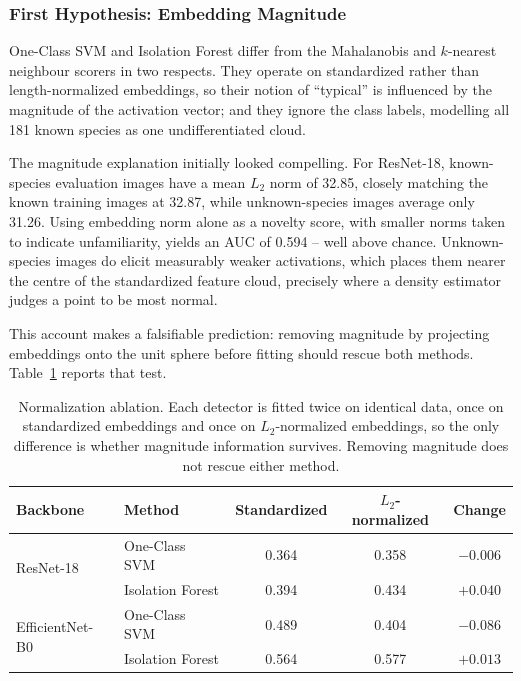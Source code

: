 \documentclass[11pt]{article}
\begin{document}
\subsubsection{First Hypothesis: Embedding Magnitude}

One-Class SVM and Isolation Forest differ from the Mahalanobis and $k$-nearest neighbour scorers in two respects. They operate on standardized rather than length-normalized embeddings, so their notion of ``typical'' is influenced by the magnitude of the activation vector; and they ignore the class labels, modelling all 181 known species as one undifferentiated cloud.

The magnitude explanation initially looked compelling. For ResNet-18, known-species evaluation images have a mean $L_2$ norm of 32.85, closely matching the known training images at 32.87, while unknown-species images average only 31.26. Using embedding norm alone as a novelty score, with smaller norms taken to indicate unfamiliarity, yields an AUC of 0.594 -- well above chance. Unknown-species images do elicit measurably weaker activations, which places them nearer the centre of the standardized feature cloud, precisely where a density estimator judges a point to be most normal.

This account makes a falsifiable prediction: removing magnitude by projecting embeddings onto the unit sphere before fitting should rescue both methods. Table~\ref{tab:ablation} reports that test.

\begin{table}[H]
\centering
\caption{Normalization ablation. Each detector is fitted twice on identical data, once on standardized embeddings and once on $L_2$-normalized embeddings, so the only difference is whether magnitude information survives. Removing magnitude does not rescue either method.}
\label{tab:ablation}

\begin{tabular}{llccc}
\toprule
Backbone & Method & Standardized & $L_2$-normalized & Change \\
\midrule
\multirow{2}{*}{ResNet-18}
 & One-Class SVM    & 0.364 & 0.358 & $-0.006$ \\
 & Isolation Forest & 0.394 & 0.434 & $+0.040$ \\
\midrule
\multirow{2}{*}{EfficientNet-B0}
 & One-Class SVM    & 0.489 & 0.404 & $-0.086$ \\
 & Isolation Forest & 0.564 & 0.577 & $+0.013$ \\
\bottomrule
\end{tabular}
\end{table}
\end{document}
